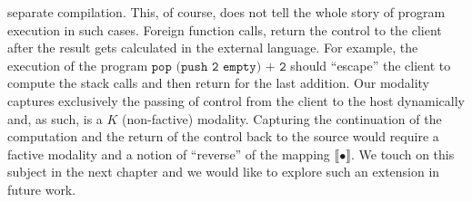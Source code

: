 \begin{itemize}
            separate compilation. This, of course, does not tell the whole story of program execution in such cases. Foreign function calls, return the control to the 
            client after the result gets calculated 
            in the external language. For example, the execution of the  program ${\texttt{pop (push 2 empty) + 2}}$ should ``escape'' the client 
            to compute the stack calls and then return
            for the last addition. Our modality captures  exclusively the passing of control from the client to the host 
            dynamically and, as such, is a $K$ 
            (non-factive) modality. Capturing the continuation of the computation and the return of the control back 
            to the source would  require a factive modality and a notion of ``reverse'' of the mapping $\llbracket\bullet\rrbracket$. 
            We touch on this subject in the next chapter and we would like to explore  such an extension in  future work.
        \end{itemize}
        
        
        
        
